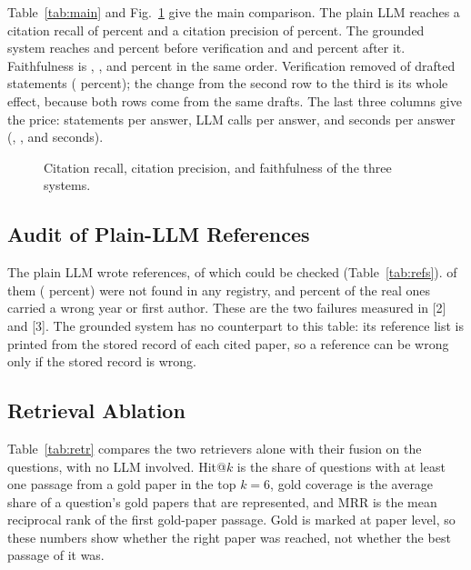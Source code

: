 \documentclass[10pt,twocolumn,letterpaper]{article}
\begin{document}
Table~\ref{tab:main} and Fig.~\ref{fig:main} give the main comparison. The plain LLM reaches a citation recall of \ResCRbase{} percent and a citation precision of \ResCPbase{} percent. The grounded system reaches \ResCRdraft{} and \ResCPdraft{} percent before verification and \ResCRver{} and \ResCPver{} percent after it. Faithfulness is \ResFAbase{}, \ResFAdraft{}, and \ResFAver{} percent in the same order. Verification removed \ResRemovedN{} of \ResDraftN{} drafted statements (\ResRemovedPct{} percent); the change from the second row to the third is its whole effect, because both rows come from the same drafts. The last three columns give the price: statements per answer, LLM calls per answer, and seconds per answer (\ResSecBase{}, \ResSecDraft{}, and \ResSecVer{} seconds).

\begin{figure}[t]
\centering
\ResFigMain
\caption{Citation recall, citation precision, and faithfulness of the three systems.}
\label{fig:main}
\end{figure}

\subsection{Audit of Plain-LLM References}
\begin{table}[t]
\caption{References Written by the Plain LLM}
\label{tab:refs}
\footnotesize\centering
\ResTableRefs
\end{table}

The plain LLM wrote \ResRefTotal{} references, of which \ResRefChecked{} could be checked (Table~\ref{tab:refs}). \ResRefFab{} of them (\ResRefFabPct{} percent) were not found in any registry, and \ResRefErrPct{} percent of the real ones carried a wrong year or first author. These are the two failures measured in [2] and [3]. The grounded system has no counterpart to this table: its reference list is printed from the stored record of each cited paper, so a reference can be wrong only if the stored record is wrong.

\subsection{Retrieval Ablation}
\begin{table}[t]
\caption{Retrieval on the Ask Research Questions}
\label{tab:retr}
\footnotesize\centering
\ResTableRetrieval
\end{table}

Table~\ref{tab:retr} compares the two retrievers alone with their fusion on the \ResNAsk{} questions, with no LLM involved. Hit@$k$ is the share of questions with at least one passage from a gold paper in the top $k=6$, gold coverage is the average share of a question's gold papers that are represented, and MRR is the mean reciprocal rank of the first gold-paper passage. Gold is marked at paper level, so these numbers show whether the right paper was reached, not whether the best passage of it was.
\end{document}
